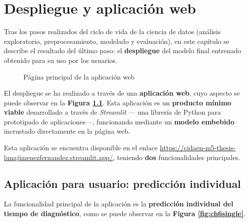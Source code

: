 \chapter{Despliegue y aplicación web}

Tras los pasos realizados del ciclo de vida de la ciencia de datos (análisis exploratorio, preprocesamiento, modelado y evaluación), en este capítulo se describe el resultado del último paso: el \textbf{despliegue} del modelo final entrenado obtenido para su uso por los usuarios.

\begin{figure}[h]
	\vspace{-6mm}
	\centering
	\captionsetup{belowskip=-20pt, justification=centering}
	\caption{Página principal de la aplicación web}
	\label{fig:ch6main}
\end{figure}

El despliegue se ha realizado a través de una \textbf{aplicación web}, cuyo aspecto se puede observar en la \textbf{Figura \ref{fig:ch6main}}. Esta aplicación es un \textbf{producto mínimo viable} desarrollado a través de \textit{Streamlit} --- una librería de Python para prototipado de aplicaciones---, funcionando mediante un \textbf{modelo embebido} incrustado directamente en la página web. 

Esta aplicación se encuentra disponible en el enlace \url{https://cidaen-m5-thesis-lunajimenezfernandez.streamlit.app/}, teniendo \textbf{dos} funcionalidades principales.


\vspace*{-4mm}
\section{Aplicación para usuario: predicción individual}

La funcionalidad principal de la aplicación es la \textbf{predicción individual del tiempo de diagnóstico}, como se puede observar en la \textbf{Figura \ref{fig:ch6single}}.

